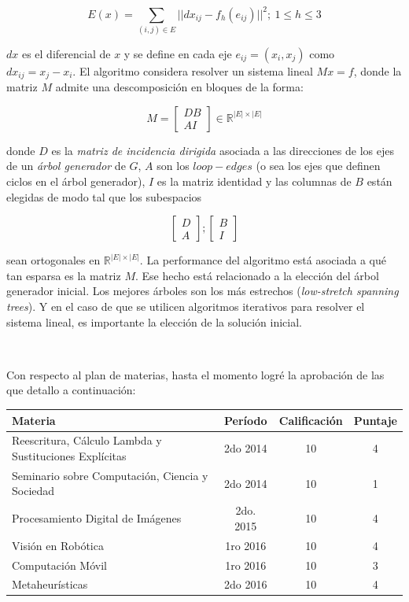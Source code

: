 \documentclass{article}
\begin{document}
$$E(x) = \sum_{(i,j) \in E} ||dx_{ij} - f_h(e_{ij})||^2 ; \ 1 \le h \le 3$$

$dx$ es el diferencial de $x$ y se define en cada eje $e_{ij}=(x_i,x_j)$ 
como $dx_{ij} = x_j - x_i$. El algoritmo considera resolver un sistema 
lineal $M x = f$, donde la matriz $M$ admite una descomposición en bloques 
de la forma:

\begin{equation}
     M=\begin{bmatrix}
         D B\\
         A I
	\end{bmatrix} \in \mathbb{R}^{|E| \times |E|}
\end{equation}

donde $D$ es la \emph{matriz de incidencia dirigida} asociada a las direcciones 
de los ejes de un \emph{árbol generador} de $G$, $A$ son los $loop-edges$ 
(o sea los ejes que definen ciclos en el árbol generador), $I$ es la matriz 
identidad y las columnas de $B$ están elegidas de modo tal que los subespacios 

\begin{equation}
     \begin{bmatrix}
         D\\
         A
	\end{bmatrix};
	\begin{bmatrix}
         B\\
         I
	\end{bmatrix}
\end{equation}

sean ortogonales en $\mathbb{R}^{|E| \times |E|}$. 
La performance del algoritmo está asociada a qué tan esparsa es la matriz 
$M$. Ese hecho está relacionado a la elección del árbol generador inicial. 
Los mejores árboles son los más estrechos (\emph{low-stretch spanning trees}). 
Y en el caso de que se utilicen algoritmos iterativos para resolver el sistema 
lineal, es importante la elección de la solución inicial.


\

Con respecto al plan de materias, hasta el momento logré la aprobación de 
las que detallo a continuación:

\hfill

\centering
\begin{tabular}{l c c c}

\textsf{Materia} & \textsf{Período} & \textsf{Calificación} & \textsf{Puntaje}\\
\hline
Reescritura, Cálculo Lambda y Sustituciones Explícitas & 2do 2014 & 10 & 4\\
Seminario sobre Computación, Ciencia y Sociedad & 2do 2014 & 10 & 1\\
Procesamiento Digital de Imágenes & 2do. 2015 & 10  & 4 \\
Visión en Robótica & 1ro 2016 & 10 & 4 \\ 
Computación Móvil & 1ro 2016 & 10 & 3 \\ 
Metaheurísticas & 2do 2016 & 10 & 4 \\ 
\hline
\end{tabular}



\end{document}
